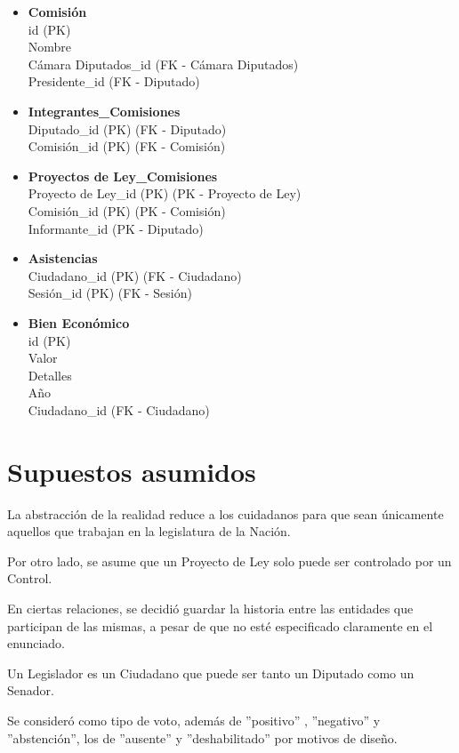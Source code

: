 \begin{itemize}
 	\item \textbf{Comisión} \\
 	id (PK) \\
 	Nombre \\
 	Cámara Diputados\_id (FK - Cámara Diputados) \\
 	Presidente\_id (FK - Diputado)
 	
	\item \textbf{Integrantes\_Comisiones} \\
	Diputado\_id (PK) (FK - Diputado) \\
	Comisión\_id (PK) (FK - Comisión) 
	
	\item \textbf{Proyectos de Ley\_Comisiones} \\
	Proyecto de Ley\_id (PK) (PK - Proyecto de Ley) \\
	Comisión\_id (PK) (PK - Comisión) \\
	Informante\_id (PK - Diputado)
	
	\item \textbf{Asistencias} \\
	Ciudadano\_id (PK) (FK - Ciudadano) \\
	Sesión\_id (PK) (FK - Sesión)
		
	\item \textbf{Bien Económico} \\
	id (PK) \\
	Valor \\
	Detalles \\ 
	Año \\
	Ciudadano\_id (FK - Ciudadano)
	
\end{itemize}

\newpage

\section{Supuestos asumidos}
La abstracción de la realidad reduce a los cuidadanos para que sean únicamente aquellos que trabajan en la legislatura de la Nación.


Por otro lado, se asume que un Proyecto de Ley solo puede ser controlado por un Control. 


En ciertas relaciones, se decidió guardar la historia entre las entidades que participan de las mismas, a pesar de que no esté especificado claramente en el enunciado.


Un Legislador es un Ciudadano que puede ser tanto un Diputado como un Senador.


Se consideró como tipo de voto, además de ''positivo'' , ''negativo'' y ''abstención'', los de ''ausente'' y ''deshabilitado'' por motivos de diseño.